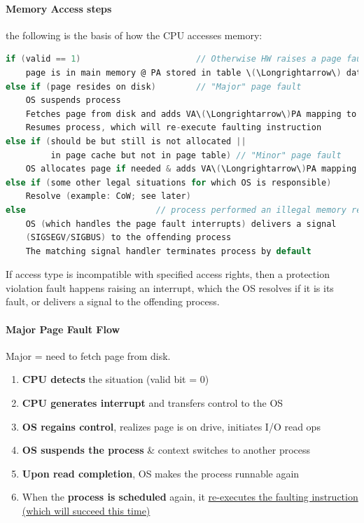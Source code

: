 \documentclass[openany,12pt]{book}
\begin{document}
\paragraph{Memory Access steps} the following is the basis of how the CPU accesses memory:
\begin{lstlisting}[language=C, caption={Memory Access Steps in Virtual Memory}, label={lst:memory_access}]
if (valid == 1)                       // Otherwise HW raises a page fault interrupt
    page is in main memory @ PA stored in table \(\Longrightarrow\) data can be used
else if (page resides on disk)        // "Major" page fault
    OS suspends process
    Fetches page from disk and adds VA\(\Longrightarrow\)PA mapping to page table
    Resumes process, which will re-execute faulting instruction
else if (should be but still is not allocated ||
         in page cache but not in page table) // "Minor" page fault
    OS allocates page if needed & adds VA\(\Longrightarrow\)PA mapping to page table
else if (some other legal situations for which OS is responsible)
    Resolve (example: CoW; see later)
else                          // process performed an illegal memory ref
    OS (which handles the page fault interrupts) delivers a signal
    (SIGSEGV/SIGBUS) to the offending process
    The matching signal handler terminates process by default
\end{lstlisting}

If access type is incompatible with specified access rights, then a protection violation fault happens raising an interrupt, which the OS resolves if it is its fault, or delivers a signal to the offending process.


\paragraph{Major Page Fault Flow} Major = need to fetch page from disk.
\begin{enumerate}
  \item \textbf{CPU detects} the situation (valid bit = 0)
  \item \textbf{CPU generates interrupt} and transfers control to the OS
  \item \textbf{OS regains control}, realizes page is on drive, initiates I/O read ops
  \item \textbf{OS suspends the process} \& context switches to another process
  \item \textbf{Upon read completion}, OS makes the process runnable again
  \item When the \textbf{process is scheduled} again, it \ul{re-executes the faulting instruction (which will succeed this time)}
\end{enumerate}
\end{document}
